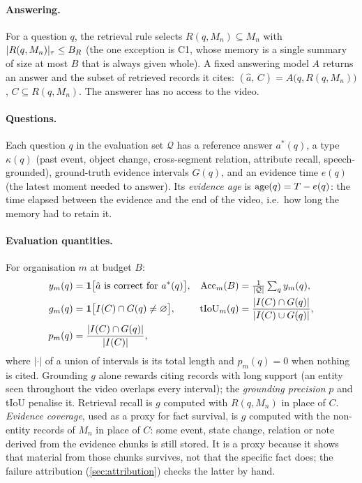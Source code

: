 \paragraph{Answering.}
For a question $q$, the retrieval rule selects $R(q,M_n)\subseteq M_n$ with
$\lvert R(q,M_n) \rvert_{\tau}\le B_R$ (the one exception is C1, whose memory is a single
summary of size at most $B$ that is always given whole). A fixed answering model
$A$ returns an answer and the
subset of retrieved records it cites: $(\hat a,\,C)=A\bigl(q,R(q,M_n)\bigr)$,
$C\subseteq R(q,M_n)$. The answerer has no access to the video.

\paragraph{Questions.}
Each question $q$ in the evaluation set $\mathcal Q$ has a reference answer
$a^\ast(q)$, a type $\kappa(q)$ (past event, object change, cross-segment
relation, attribute recall, speech-grounded), ground-truth evidence intervals
$G(q)$, and an evidence time $e(q)$ (the latest moment needed to answer). Its
\emph{evidence age} is $\operatorname{age}(q)=T-e(q)$: the time elapsed between the evidence
and the end of the video, i.e.\ how long the memory had to retain it.

\paragraph{Evaluation quantities.}
For organisation $m$ at budget $B$:
\begin{align}
  y_m(q) &= \mathbf{1}\bigl[\hat a \text{ is correct for } a^\ast(q)\bigr], &
  \mathrm{Acc}_m(B) &= \tfrac{1}{|\mathcal Q|}\textstyle\sum_{q} y_m(q),\\
  g_m(q) &= \mathbf{1}\bigl[I(C)\cap G(q)\neq\varnothing\bigr], &
  \mathrm{tIoU}_m(q) &= \frac{|I(C)\cap G(q)|}{|I(C)\cup G(q)|},\\
  p_m(q) &= \frac{|I(C)\cap G(q)|}{|I(C)|}, &&
\end{align}
where $|\cdot|$ of a union of intervals is its total length and $p_m(q)=0$ when
nothing is cited. Grounding $g$ alone rewards citing records with long support
(an entity seen throughout the video overlaps every interval); the
\emph{grounding precision} $p$ and tIoU penalise it. Retrieval recall is $g$
computed with $R(q,M_n)$ in place of $C$. \emph{Evidence coverage}, used as a
proxy for fact survival, is $g$ computed with the non-entity records of $M_n$ in
place of $C$: some event, state change, relation or note derived from the
evidence chunks is still stored. It is a proxy because it shows that material
from those chunks survives, not that the specific fact does; the failure
attribution (\cref{sec:attribution}) checks the latter by hand.

